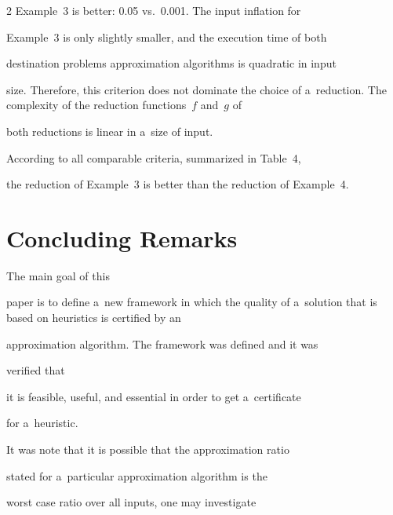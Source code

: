 \begin{multicols}{2}
Example~3 is better: 0.05 vs.~0.001. The input inflation for


Example~3 is only slightly smaller, and the execution time of both


destination problems approximation algorithms is quadratic in input


size. Therefore, this criterion does not dominate the choice of a~reduction. The complexity of the reduction functions~$f$ and~$g$ of


both reductions is linear in a~size of input.





According to all comparable criteria, summarized in Table~4,


the reduction of Example~3 is better than the reduction of Example~4.





\vspace*{-6pt}





\section{Concluding Remarks}


\label{s:Concluding}





\vspace*{-4pt}





\noindent


The main goal of this


paper is to define a~new framework in which the quality of a~solution that is based on heuristics is certified by an


approximation algorithm. The framework  was defined and it was


verified that


it is feasible, useful, and essential in order to get a~certificate


for a~heuristic.





It was note that it is possible that the approximation ratio


stated for a~particular approximation algorithm is the


worst case ratio over all inputs, one may investigate



\end{multicols}
